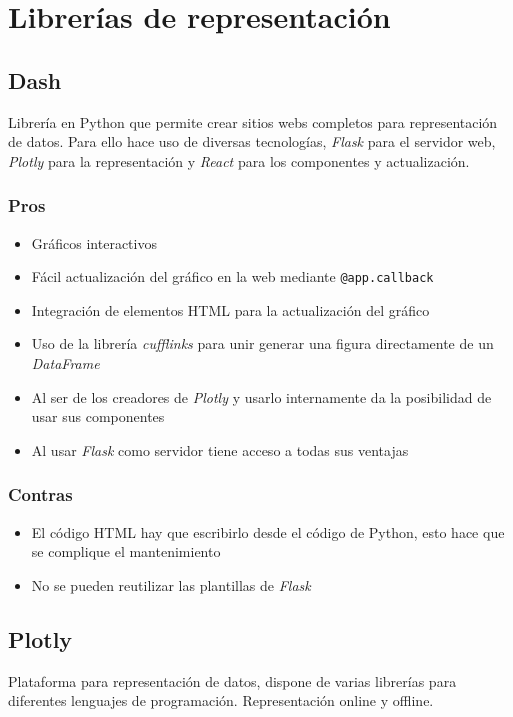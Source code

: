
\section{Librerías de representación}

\subsection{Dash}
Librería en Python que permite crear sitios webs completos para representación
de datos. Para ello hace uso de diversas tecnologías, \textit{Flask} para el
servidor web, \textit{Plotly} para la representación y \textit{React} para los
componentes y actualización.
\subsubsection{Pros}
\begin{itemize}
	\item Gráficos interactivos
	\item Fácil actualización del gráfico en la web mediante \verb|@app.callback|
	\item Integración de elementos HTML para la actualización del gráfico
	\item Uso de la librería \textit{cufflinks} para unir generar una figura
	directamente de un \textit{DataFrame}
	\item Al ser de los creadores de \textit{Plotly} y usarlo internamente da la
	posibilidad de usar sus componentes
	\item Al usar \textit{Flask} como servidor tiene acceso a todas sus ventajas
\end{itemize}
\subsubsection{Contras}
\begin{itemize}
	\item El código HTML hay que escribirlo desde el código de Python, esto hace
	que se complique el mantenimiento
	\item No se pueden reutilizar las plantillas de \textit{Flask}
\end{itemize}

\subsection{Plotly}
Plataforma para representación de datos, dispone de varias librerías para
diferentes lenguajes de programación. Representación online y offline.
